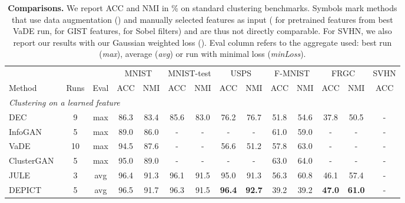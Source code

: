 \documentclass{article}
\begin{document}
\begin{table}
  \renewcommand{\arraystretch}{1}
  \addtolength{\tabcolsep}{-4pt}
  \caption{\textbf{Comparisons.}
    We report ACC and NMI in \% on standard clustering benchmarks.  Symbols mark methods that 
    use data augmentation () and manually selected features as input 
    ( for pretrained features from best VaDE run,  for GIST features, 
   for Sobel filters) and are thus not directly comparable. For SVHN, we also 
  report our results with our Gaussian weighted loss (). Eval column refers to the 
  aggregate used: best run (\textit{max}), average (\textit{avg}) or run with minimal loss 
  (\textit{minLoss}).
}
  \vspace{0.2em}
  \centering
  \scriptsize
  \begin{tabular}{@{}lccccccccccccc@{}} \toprule
  &  & & \multicolumn{2}{c}{MNIST} & \multicolumn{2}{c}{MNIST-test} &
  \multicolumn{2}{c}{USPS} & \multicolumn{2}{c}{F-MNIST} & \multicolumn{2}{c}{FRGC} & SVHN\\
  \cmidrule(lr){4-5}  \cmidrule(lr){6-7}  \cmidrule(lr){8-9} \cmidrule(lr){10-11} 
  \cmidrule(lr){12-13} \cmidrule(ll){14-14}
  Method & Runs & Eval & ACC & NMI & ACC & NMI & ACC & NMI & ACC & NMI & ACC & NMI & ACC\\
  \midrule
  \multicolumn{13}{l}{\textit{Clustering on a learned feature}} \\
  \quad DEC~\cite{xieUnsupervisedDeepEmbedding2016, yangDeepSpectralClustering2019} & 9 & max 
  & 86.3 & 83.4 & 85.6 & 83.0 & 76.2 & 76.7 & 51.8 & 54.6 & 37.8 & 50.5 & - \\
  \quad InfoGAN~\cite{chenInfoGANInterpretableRepresentation2016, 
  mukherjeeClusterGANLatentSpace2019} & 5 & max &
  89.0 & 86.0 & - & - & - & - & 61.0 & 59.0 & - & - & - \\
  \quad VaDE~\cite{jiangVariationalDeepEmbedding2017, yangDeepSpectralClustering2019} & 10 & 
  max & 94.5 & 87.6 & - & - & 56.6 & 51.2 & 57.8 & 63.0 & - & - & - \\
  \quad ClusterGAN~\cite{mukherjeeClusterGANLatentSpace2019} & 5 & max &
  95.0 & 89.0 & - & - & - & - & 63.0 & 64.0 & - & - & - \\
  \quad JULE~\cite{yangJointUnsupervisedLearning2016} & 3 & avg &
  96.4 & 91.3 & 96.1 & 91.5 & 95.0 & 91.3 & 56.3 & 60.8 & 46.1 & 57.4 & -\\
  \quad DEPICT~\cite{dizajiDeepClusteringJoint2017} & 5 & avg &
  96.5 & 91.7 & 96.3 & 91.5 &\bf 96.4 &\bf 92.7 & 39.2 & 39.2 &\bf 47.0 &\bf 61.0 & - \\

\end{tabular}
\end{table}
\end{document}
